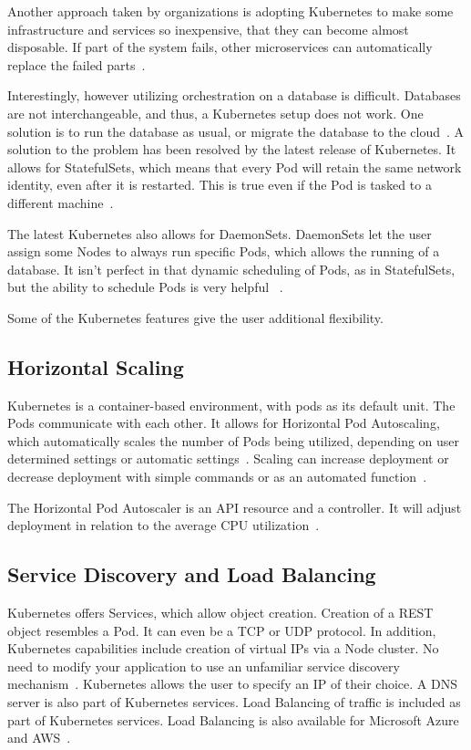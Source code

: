 Another approach taken by organizations is adopting Kubernetes to make
some infrastructure and services so inexpensive, that they can become
almost disposable.  If part of the system fails, other microservices
can automatically replace the failed parts~\cite{reasons}.  

Interestingly, however utilizing orchestration on a database is
difficult.  Databases are not interchangeable, and thus, a Kubernetes
setup does not work.  One solution is to run the database as usual, or
migrate the database to the cloud~\cite{reasons}.  A solution to the
problem has been resolved by the latest release of Kubernetes.  It
allows for StatefulSets, which means that every Pod will retain the
same network identity, even after it is restarted.  This is true even
if the Pod is tasked to a different machine~\cite{reasons}.  

The latest Kubernetes also allows for DaemonSets.  DaemonSets let the
user assign some Nodes to always run specific Pods, which allows the
running of a database.  It isn't perfect in that dynamic scheduling of
Pods, as in StatefulSets, but the ability to schedule Pods is very
helpful ~\cite{reasons}.

Some of the Kubernetes features give the user additional flexibility.  

\subsection{Horizontal Scaling}

Kubernetes is a container-based environment, with pods as its default 
unit. The Pods communicate with each other.  It allows for Horizontal
Pod Autoscaling, which automatically scales the number of Pods being
utilized, depending on user determined settings or automatic
settings~\cite{concept}. Scaling can increase deployment or decrease
deployment with simple commands or as an automated
function~\cite{concept}.

The Horizontal Pod Autoscaler is an API resource and a controller.  It
will adjust deployment in relation to the average CPU
utilization~\cite{concept}.  

\subsection{Service Discovery and Load Balancing}

Kubernetes offers Services, which allow object creation.  Creation of
a REST object resembles a Pod.  It can even be a TCP or UDP protocol.
In addition, Kubernetes capabilities include creation of virtual IPs
via a Node cluster.  No need to modify your application to use an
unfamiliar service discovery mechanism~\cite{concept}. Kubernetes
allows the user to specify an IP of their choice.  A DNS server is
also part of Kubernetes services.  Load Balancing of traffic is
included as part of Kubernetes services.  Load Balancing is also
available for Microsoft Azure and AWS~\cite{concept}.

